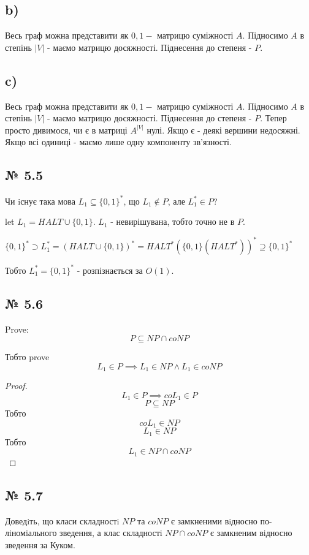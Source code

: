\documentclass[11pt, a4paper]{article} %
\begin{document}
\subsection*{b)}
Весь граф можна представити як $0,1-$ матрицю суміжності $A$. Підносимо $A$ в степінь $|V|$ - маємо матрицю досяжності.
Піднесення до степеня - $P$.


\subsection*{c)}
Весь граф можна представити як $0,1-$ матрицю суміжності $A$. Підносимо $A$ в степінь $|V|$ - маємо матрицю досяжності.
Піднесення до степеня - $P$.
Тепер просто дивимося, чи є в матриці $A^{|V|}$ нулі. Якщо є - деякі вершини недосяжні. Якщо всі одиниці - маємо лише одну компоненту зв'язності.

\subsection*{№ 5.5}
\begin{mdframed}
    Чи iснує така мова $L_1 \subseteq \{0,1\}^*$, що $L_1 \notin P$, але $L_1^* \in P$?
\end{mdframed}

let $L_1 = HALT \cup \{0,1\}$.
$L_1$ - невирішувана, тобто точно не в $P$.

$\{0,1\}^* \supset L_1^* = (HALT \cup \{0,1\})^* = HALT^* (\{0,1\}(HALT^*))^* \supseteq \{0,1\}^*$

Тобто $L_1^* = \{0,1\}^*$ - розпізнається за $O(1)$.

\subsection*{№ 5.6}
\begin{mdframed}
    Prove: $$P \subseteq NP \cap coNP$$
\end{mdframed}

Тобто prove $$L_1 \in P \implies L_1 \in NP \wedge L_1 \in coNP$$

\begin{proof}
    $$L_1 \in P \implies coL_1 \in P$$
    $$P \subseteq NP$$
    Тобто 
    $$coL_1 \in NP$$
    $$L_1 \in NP$$
    Тобто
    $$L_1 \in NP \cap coNP$$
\end{proof}

\subsection*{№ 5.7}
\begin{mdframed}
    Доведiть, що класи складностi $NP$ та $coNP$ є замкненими вiдносно по-
лiномiального зведення, а клас складностi $NP \cap coNP$ є замкненим вiдносно
зведення за Куком.
\end{mdframed}
\end{document}
